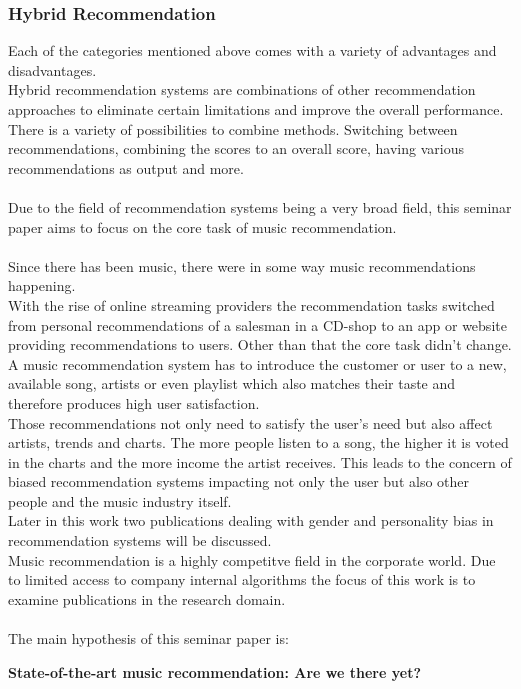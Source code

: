 \documentclass[runningheads,a4paper]{llncs}
\begin{document}
\subsubsection{Hybrid Recommendation}
Each of the categories mentioned above comes with a variety of advantages and disadvantages. \\
Hybrid recommendation systems are combinations of other recommendation approaches to eliminate certain 
limitations and improve the overall performance. 
There is a variety of possibilities to combine methods.
Switching between recommendations, combining the scores to an overall score, having various recommendations as output
 and more. \cite{burke2002hybrid}\\
\\
Due to the field of recommendation systems being a very broad field, this seminar paper aims to 
focus on the core task of music recommendation. \\
\\
Since there has been music, there were in some way music recommendations happening. \\
With the rise of online streaming providers the recommendation tasks switched from personal recommendations 
of a salesman in a CD-shop to an app or website providing recommendations to users.
Other than that the core task didn't change. A music recommendation system has to introduce the customer or user to a new, available song, artists or even playlist which 
also matches their taste and therefore produces high user satisfaction.\\
Those recommendations not only need to satisfy the user's need but also affect artists, trends and charts.
The more people listen to a song, the higher it is voted in the charts and the more income the artist receives. 
This leads to the concern of biased recommendation systems impacting not only the user but also other people and the music industry itself. \\
Later in this work two publications dealing with gender and personality bias in recommendation systems will be discussed. \\
Music recommendation is a highly competitve field in the corporate world. 
Due 
to limited access to company internal algorithms the focus of this work is to examine publications in the research domain. \\
\\ 
The main hypothesis of this seminar paper is:
\begin{center}
  \textbf{State-of-the-art music recommendation: Are we there yet?}
\end{center}
\end{document}
